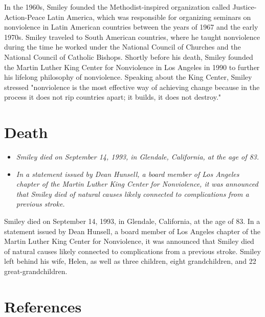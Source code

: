 In the 1960s, Smiley founded the Methodist-inspired organization called
Justice-Action-Peace Latin America, which was responsible for organizing
seminars on nonviolence in Latin American countries between the years of
1967 and the early 1970s. Smiley traveled to South American countries,
where he taught nonviolence during the time he worked under the National
Council of Churches and the National Council of Catholic Bishops.
Shortly before his death, Smiley founded the Martin Luther King Center
for Nonviolence in Los Angeles in 1990 to further his lifelong
philosophy of nonviolence. Speaking about the King Center, Smiley
stressed "nonviolence is the most effective way of achieving change
because in the process it does not rip countries apart; it builds, it
does not destroy."

\section{Death}\label{death}

\begin{itemize}
\item
  \emph{Smiley died on September 14, 1993, in Glendale, California, at
  the age of 83.}
\item
  \emph{In a statement issued by Dean Hunsell, a board member of Los
  Angeles chapter of the Martin Luther King Center for Nonviolence, it
  was announced that Smiley died of natural causes likely connected to
  complications from a previous stroke.}
\end{itemize}

Smiley died on September 14, 1993, in Glendale, California, at the age
of 83. In a statement issued by Dean Hunsell, a board member of Los
Angeles chapter of the Martin Luther King Center for Nonviolence, it was
announced that Smiley died of natural causes likely connected to
complications from a previous stroke. Smiley left behind his wife,
Helen, as well as three children, eight grandchildren, and 22
great-grandchildren.

\section{References}\label{references}
